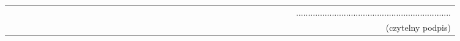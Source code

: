 \vspace{14ex}

\begin{center}
    \begin{tabular}{lr}
        ~~~~~~~~~~~~~~~~~~~~~~~~~~~~~~~~~~~~~~~~~~~~~~~~~~~~~~~~~~~~~~~~~ &
        .................................................................                           \\
        ~                                                                 & {\sf (czytelny podpis)} \\
    \end{tabular}
\end{center}